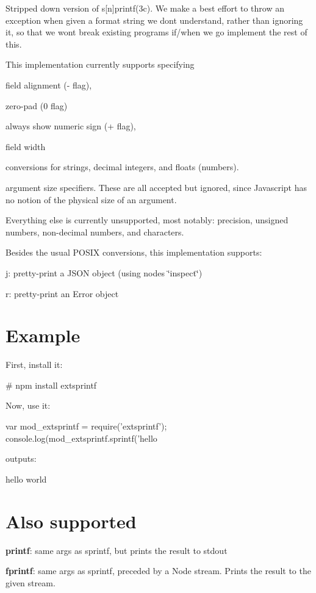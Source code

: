 Stripped down version of s\mbox{[}n\mbox{]}printf(3c). We make a best effort to throw an exception when given a format string we don\textquotesingle{}t understand, rather than ignoring it, so that we won\textquotesingle{}t break existing programs if/when we go implement the rest of this.

This implementation currently supports specifying


\begin{DoxyItemize}
\item field alignment (\textquotesingle{}-\/\textquotesingle{} flag),
\item zero-\/pad (\textquotesingle{}0\textquotesingle{} flag)
\item always show numeric sign (\textquotesingle{}+\textquotesingle{} flag),
\item field width
\item conversions for strings, decimal integers, and floats (numbers).
\item argument size specifiers. These are all accepted but ignored, since Javascript has no notion of the physical size of an argument.
\end{DoxyItemize}

Everything else is currently unsupported, most notably\+: precision, unsigned numbers, non-\/decimal numbers, and characters.

Besides the usual P\+O\+S\+IX conversions, this implementation supports\+:


\begin{DoxyItemize}
\item {\ttfamily j}\+: pretty-\/print a J\+S\+ON object (using node\textquotesingle{}s \char`\"{}inspect\char`\"{})
\item {\ttfamily r}\+: pretty-\/print an Error object
\end{DoxyItemize}

\section*{Example}

First, install it\+: \begin{DoxyVerb}# npm install extsprintf
\end{DoxyVerb}


Now, use it\+: \begin{DoxyVerb}var mod_extsprintf = require('extsprintf');
console.log(mod_extsprintf.sprintf('hello %
\end{DoxyVerb}


outputs\+: \begin{DoxyVerb}hello                     world
\end{DoxyVerb}


\section*{Also supported}

{\bfseries printf}\+: same args as sprintf, but prints the result to stdout

{\bfseries fprintf}\+: same args as sprintf, preceded by a Node stream. Prints the result to the given stream. 